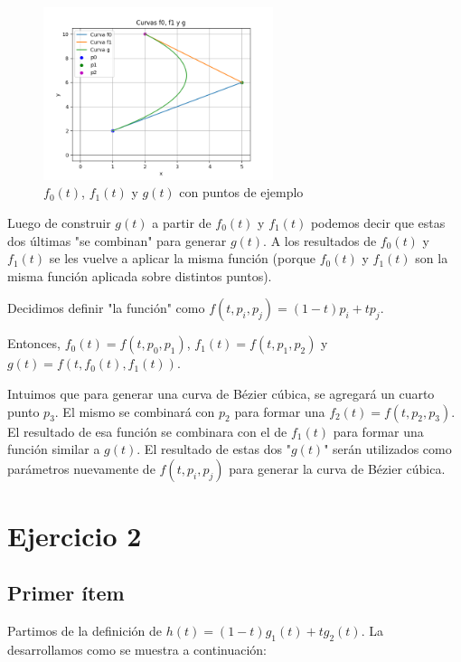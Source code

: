 \documentclass{article}
\begin{document}
\begin{figure}[H]
    \centering
    \includegraphics[width=0.6\textwidth]{imagenes/graf_ej1.png}
    \caption{$f_0(t)$, $f_1(t)$ y $g(t)$ con puntos de ejemplo}
    \label{fig:ejemplo}
\end{figure}

Luego de construir $g(t)$ a partir de $f_0(t)$ y $f_1(t)$ podemos decir que estas dos últimas "se combinan" para generar  $g(t)$. A los resultados de $f_0(t)$ y $f_1(t)$ se les vuelve a aplicar la misma función (porque $f_0(t)$ y $f_1(t)$ son la misma función aplicada sobre distintos puntos).

Decidimos definir "la función" como $f(t, p_i, p_j) = (1-t) p_i + t p_j$.

Entonces, $f_0(t) = f(t, p_0, p_1)$, $f_1(t) = f(t, p_1, p_2)$ y $g(t) = f(t, f_0(t), f_1(t))$.

Intuimos que para generar una curva de Bézier cúbica, se agregará un cuarto punto $p_3$. El mismo se combinará con $p_2$ para formar una $f_2(t) = f(t, p_2, p_3)$. El resultado de esa función se combinara con el de $f_1(t)$ para formar una función similar a $g(t)$. El resultado de estas dos "$g(t)$" serán utilizados como parámetros nuevamente de $f(t, p_i, p_j)$ para generar la curva de Bézier cúbica.

\section*{Ejercicio 2}
\subsection*{Primer ítem}
Partimos de la definición de $h(t) = (1 - t)g_1(t) + t g_2(t)$. La desarrollamos como se muestra a continuación:
\end{document}
